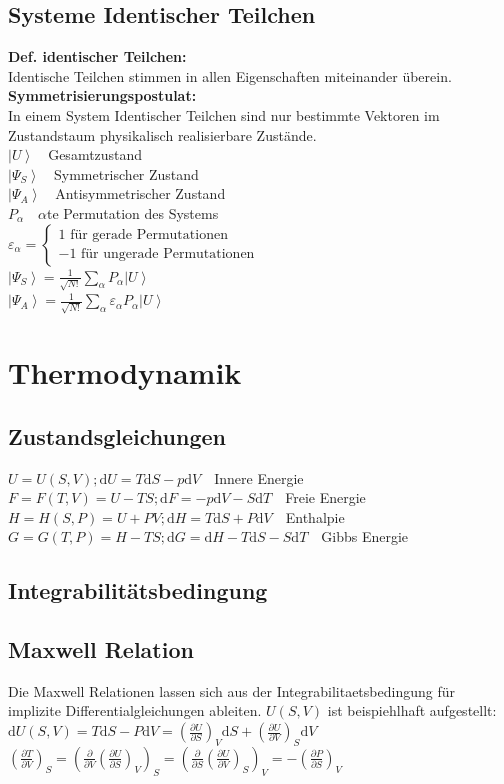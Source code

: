 \documentclass[8pt,a4paper]{extarticle}
\newcommand{\frml}[2]{$#1$~\hfill~#2\\}
\newcommand{\pder}[2]{\frac{\partial#1}{\partial#2}}
\newcommand{\pderc}[3]{\left(\frac{\partial#1}{\partial#2}\right)_{#3}}
\newcommand{\totd}[1]{\mathrm{d}#1}
\newcommand{\ket}[1]{\left|#1\right\rangle}
\begin{document}
\begin{multicols}{3}
\subsection{Systeme Identischer Teilchen}
\textbf{Def. identischer Teilchen:}\\
Identische Teilchen stimmen in allen Eigenschaften miteinander \"uberein.\\
\textbf{Symmetrisierungspostulat:}\\
In einem System Identischer Teilchen sind nur bestimmte Vektoren im Zustandstaum physikalisch realisierbare Zust\"ande.\\
\frml{\ket{U}}{Gesamtzustand}
\frml{\ket{\Psi_S}}{Symmetrischer Zustand}
\frml{\ket{\Psi_A}}{Antisymmetrischer Zustand}
\frml{P_\alpha}{$\alpha$te Permutation des Systems}
\frml{\varepsilon_\alpha = \begin{cases} 1 \text{ f\"ur gerade Permutationen} \\ -1 \text{ f\"ur ungerade Permutationen} \end{cases}}{}
\frml{\ket{\Psi_S} = \frac{1}{\sqrt{N!}} \sum_\alpha P_\alpha \ket{U}}{}
\frml{\ket{\Psi_A} = \frac{1}{\sqrt{N!}} \sum_\alpha \varepsilon_\alpha P_\alpha \ket{U}}{}

\section{Thermodynamik}
\subsection{Zustandsgleichungen}
\frml{U = U(S,V); \mathrm{d}U = T\mathrm{d}S-p\mathrm{d}V}{Innere Energie}
\frml{F = F(T,V) = U - TS; \mathrm{d}F = -p\mathrm{d}V-S\mathrm{d}T}{Freie Energie}
\frml{H = H(S,P) = U + PV; \mathrm{d}H = T\mathrm{d}S +P\mathrm{d}V}{Enthalpie}
\frml{G = G(T,P) = H - TS; \mathrm{d}G = \mathrm{d}H - T\mathrm{d}S - S\mathrm{d}T}{Gibbs Energie}
\subsection{Integrabilit\"atsbedingung}
\subsection{Maxwell Relation}
Die Maxwell Relationen lassen sich aus der Integrabilitaetsbedingung f\"ur implizite Differentialgleichungen ableiten.
$U(S,V)$ ist beispiehlhaft aufgestellt:\\
\frml{\totd{U(S,V)} = T\totd{S} - P\totd{V} = \pderc{U}{S}{V}\totd{S} + \pderc{U}{V}{S}\totd{V}}{}
\frml{\pderc{T}{V}{S} = \left(\pder{}{V}\pderc{U}{S}{V}\right)_S = \left(\pder{}{S}\pderc{U}{V}{S}\right)_V = -\pderc{P}{S}{V}}{}
\end{multicols}
\end{document}
